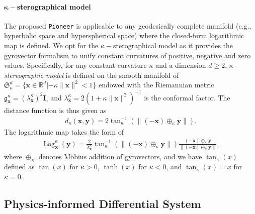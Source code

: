 \paragraph{$\boldsymbol \kappa-$sterographical model}
The proposed \texttt{Pioneer} is applicable to any geodesically complete manifold (e.g., hyperbolic space and hyperspherical space) where the closed-form logarithmic map is defined.
We opt for the $\kappa-$sterographical model as it provides the gyrovector formalism to unify constant curvatures of positive, negative and zero values.
Specifically, for any constant curvature $\kappa$ and a dimension $d \geq 2$, 
\emph{$\kappa$-stereographic model} is defined on the smooth manifold of 
$
\mathfrak{S}_{\kappa }^{d}=\{ \boldsymbol{x} \in \mathbb{R}^d | -\kappa \rVert \boldsymbol{x}\lVert^2 < 1 \} 
$
endowed with the Riemannian metric 
$\mathfrak g_{\boldsymbol{x}}^{\kappa } =(\lambda_{\boldsymbol{x}}^\kappa)^2\boldsymbol {I}$, and 
$ \lambda_{\boldsymbol{x}}^\kappa=2(1+\kappa \|  {\boldsymbol{x}} \|^2)^{-1}$ is the conformal factor.
The distance function is thus given as 
\begin{align}
    d_\kappa(\boldsymbol{x}, \boldsymbol{y})=2\tan_\kappa^{-1}(\lVert (-\boldsymbol{x}) \oplus_\kappa \boldsymbol{y} \rVert).
    \label{Distance}
\end{align}
The logarithmic map takes the form of  
\begin{align}
    {\operatorname{Log}_{\boldsymbol{x}}^\kappa}(\boldsymbol{y})
    =\frac{2}{ \lambda_{\boldsymbol{x}}^\kappa }
    \tan_\kappa^{-1}(\lVert (-\boldsymbol{x}) \oplus_\kappa \boldsymbol{y} \rVert)\frac{(-\boldsymbol{x}) \oplus_\kappa \boldsymbol{y}}{\lVert (-\boldsymbol{x}) \oplus_\kappa \boldsymbol{y} \rVert},
    \label{LogMap}
\end{align}
where $\oplus_\kappa$ denotes M\"{o}bius addition of gyrovectors, and we have $\tan_\kappa(x)$ defined as $\tan(x)$ for $\kappa>0$, 
$\tanh(x)$ for $\kappa<0$, and $\tan_\kappa(x)=x$ for  $\kappa=0$.


\subsection{Physics-informed Differential System} 

